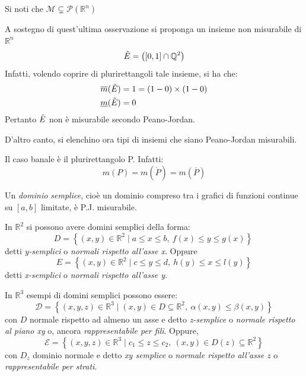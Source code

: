 \begin{oss}
    Si noti che $\mathcal{M} \subsetneq \mathcal{P}(\mathbb{R}^n)$
\end{oss}
\begin{example}
    A sostegno di quest'ultima osservazione si proponga un insieme non misurabile di $\mathbb{R}^n$
    \begin{equation*}
        \Tilde{E}=\left( \left[0,1\right] \cap \mathbb{Q}^2\right)
    \end{equation*}
    Infatti, volendo coprire di plurirettangoli tale insieme, si ha che:
    \begin{align*}
        &\overline{m}(\Tilde{E})=1=(1-0)\times(1-0)\\
        &\underline{m}(\Tilde{E})=0
    \end{align*}
    Pertanto $\Tilde{E}$ non è misurabile secondo Peano-Jordan.
\end{example}
D'altro canto, si elenchino ora tipi di insiemi che siano Peano-Jordan misurabili.
\begin{example}
    Il caso banale è il plurirettangolo P. Infatti:
    \begin{equation*}
    m(P)=m(\mathring{P})=m(\overline{P})       
    \end{equation*}
\end{example}
\begin{example} \label{Def: Dominio normale}
    Un \textit{dominio semplice}, cioè un dominio compreso tra i grafici di funzioni continue su $\left[a,b\right]$ limitate, è P.J. misurabile.
    
    In $\mathbb{R}^2$ si possono avere domini semplici della forma:
    \begin{equation*}
            D= \left\{ (x, y) \in \mathbb{R}^2 \mid a \leq x \leq b ,\ f(x)\leq y \leq g(x) \right\}\        
    \end{equation*}
    detti \textit{y-semplici} o \textit{normali rispetto all'asse x}. Oppure
    \begin{equation*}
        E= \left\{(x, y) \in \mathbb{R}^2\mid c \leq y \leq d,\ h(y) \leq x \leq l(y)\right\}
    \end{equation*}
    detti \textit{x-semplici} o \textit{normali rispetto all'asse y}.
    \vspace*{6pt}                       
    
    In $\mathbb{R}^3$ esempi di domini semplici possono essere:
    \begin{equation*}
        \mathcal{D}=\left\{(x,y,z) \in \mathbb{R}^3 \mid (x,y) \in D \subseteq \mathbb{R}^2,\ \alpha(x, y) \leq \beta(x,y) \right\}
    \end{equation*}
    con $D$ normale rispetto ad almeno un asse e detto \textit{z-semplice} o \textit{normale rispetto al piano xy} o, ancora \textit{rappresentabile per fili}. Oppure, 
    \begin{equation*}
        \mathcal{E}=\left\{(x,y,z) \in \mathbb{R}^3 \mid c_1 \leq z \leq c_2,\ (x,y) \in D(z)\subseteq \mathbb{R}^2\right\}
    \end{equation*}
    con $D_z$ dominio normale e detto \textit{xy semplice} o \textit{normale rispetto all'asse $z$} o \textit{rappresentabile per strati}.
\end{example}
